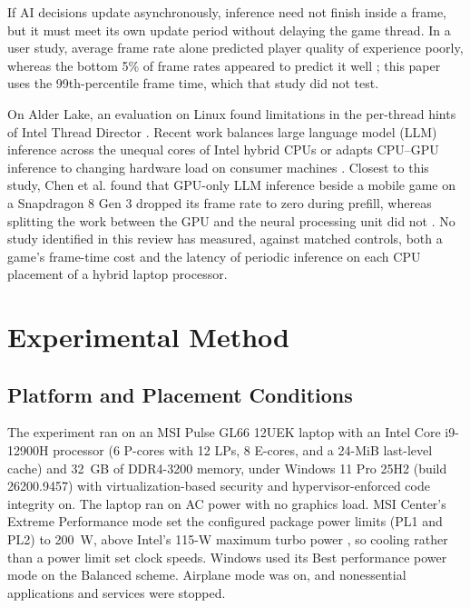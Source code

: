 \documentclass[conference]{IEEEtran}
\begin{document}
If AI decisions update asynchronously, inference need not finish inside a frame, but it must meet its own update period without delaying the game thread. In a user study, average frame rate alone predicted player quality of experience poorly, whereas the bottom 5\% of frame rates appeared to predict it well \cite{liu}; this paper uses the 99th-percentile frame time, which that study did not test.

On Alder Lake, an evaluation on Linux found limitations in the per-thread hints of Intel Thread Director \cite{saez2022}. Recent work balances large language model (LLM) inference across the unequal cores of Intel hybrid CPUs \cite{luo2024} or adapts CPU--GPU inference to changing hardware load on consumer machines \cite{atsinfer}. Closest to this study, Chen et al. found that GPU-only LLM inference beside a mobile game on a Snapdragon 8 Gen 3 dropped its frame rate to zero during prefill, whereas splitting the work between the GPU and the neural processing unit did not \cite{chen2025}. No study identified in this review has measured, against matched controls, both a game's frame-time cost and the latency of periodic inference on each CPU placement of a hybrid laptop processor.

\section{Experimental Method}
\subsection{Platform and Placement Conditions}
The experiment ran on an MSI Pulse GL66 12UEK laptop with an Intel Core i9-12900H processor (6 P-cores with 12 LPs, 8 E-cores, and a 24-MiB last-level cache) and 32~GB of DDR4-3200 memory, under Windows 11 Pro 25H2 (build 26200.9457) with virtualization-based security and hypervisor-enforced code integrity on. The laptop ran on AC power with no graphics load. MSI Center's Extreme Performance mode set the configured package power limits (PL1 and PL2) to 200~W, above Intel's 115-W maximum turbo power \cite{intelspec}, so cooling rather than a power limit set clock speeds. Windows used its Best performance power mode on the Balanced scheme. Airplane mode was on, and nonessential applications and services were stopped.

\end{document}
